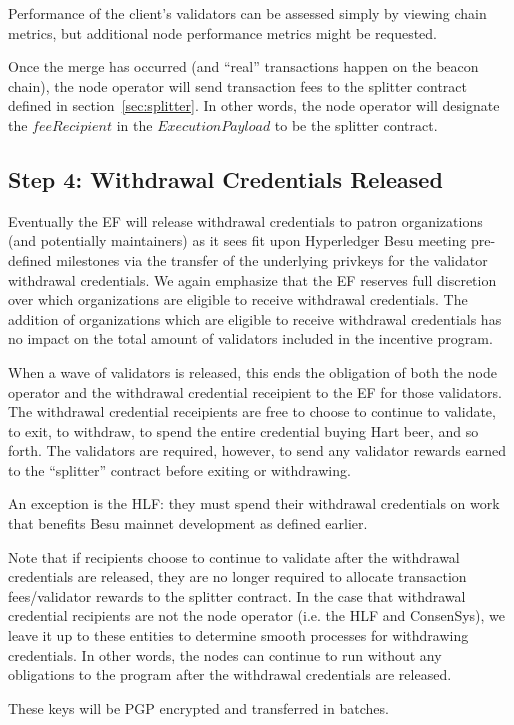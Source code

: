 Performance of the client’s validators can be assessed simply by viewing chain metrics, but additional node performance metrics might be requested.

Once the merge has occurred (and ``real'' transactions happen on the beacon chain), the node operator will send transaction fees to the splitter contract defined in section~\ref{sec:splitter}. In other words, the node operator will designate the $feeRecipient$ in the $ExecutionPayload$ to be the splitter contract.

\subsection{Step 4:  Withdrawal Credentials Released}
Eventually the EF will release withdrawal credentials to patron organizations (and potentially maintainers) as it sees fit upon Hyperledger Besu meeting pre-defined milestones via the transfer of the underlying privkeys for the validator withdrawal credentials.  We again emphasize that the EF reserves full discretion over which organizations are eligible to receive withdrawal credentials. The addition of organizations which are eligible to receive withdrawal credentials has no impact on the total amount of validators included in the incentive program.

When a wave of validators is released, this ends the obligation of both the node operator and the withdrawal credential receipient to the EF for those validators. The withdrawal credential receipients are free to choose to continue to validate, to exit, to withdraw, to spend the entire credential buying Hart beer, and so forth.  The validators are required, however, to send any validator rewards earned to the ``splitter'' contract before exiting or withdrawing.

An exception is the HLF:  they must spend their withdrawal credentials on work that benefits Besu mainnet development as defined earlier.

Note that if recipients choose to continue to validate after the withdrawal credentials are released, they are no longer required to allocate transaction fees/validator rewards to the splitter contract.  In the case that withdrawal credential recipients are not the node operator (i.e. the HLF and ConsenSys), we leave it up to these entities to determine smooth processes for withdrawing credentials.  In other words, the nodes can continue to run without any obligations to the program after the withdrawal credentials are released.

These keys will be PGP encrypted and transferred in batches.
